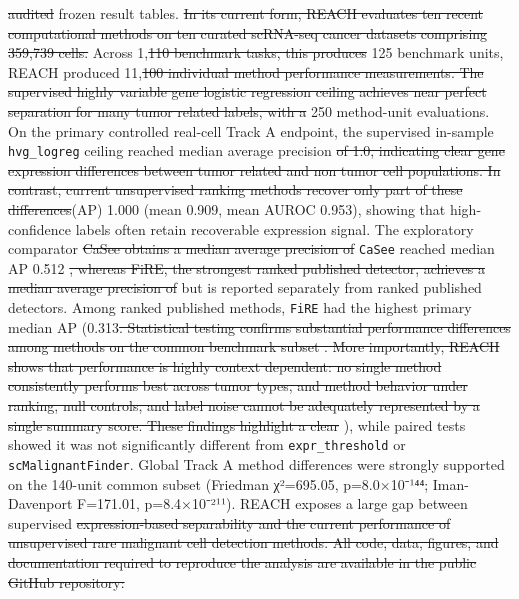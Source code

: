 \documentclass[10pt]{article}
\providecommand{\DIFaddtex}[1]{{\protect\color{trackgreen}#1}} %
\providecommand{\DIFdeltex}[1]{{\protect\color{red}\sout{#1}}}                      %
\providecommand{\DIFaddbegin}{} %
\providecommand{\DIFaddend}{} %
\providecommand{\DIFdelbegin}{} %
\providecommand{\DIFdelend}{} %
\providecommand{\DIFadd}[1]{\texorpdfstring{\DIFaddtex{#1}}{#1}} %
\providecommand{\DIFdel}[1]{\texorpdfstring{\DIFdeltex{#1}}{}} %
\newcommand{\DIFscaledelfig}{0.5}
\newlength{\DIFdelgraphicswidth} %
\newlength{\DIFdelgraphicsheight} %
\newcommand{\DIFaddincludegraphics}[2][]{{\color{trackgreen}\fbox{\DIFOincludegraphics[#1]{#2}}}} %
\newcommand{\DIFdelincludegraphics}[2][]{%
\sbox{\DIFdelgraphicsbox}{\DIFOincludegraphics[#1]{#2}}%
\settoboxwidth{\DIFdelgraphicswidth}{\DIFdelgraphicsbox} %
\settoboxtotalheight{\DIFdelgraphicsheight}{\DIFdelgraphicsbox} %
\scalebox{\DIFscaledelfig}{%
\parbox[b]{\DIFdelgraphicswidth}{\usebox{\DIFdelgraphicsbox}\\[-\baselineskip] \rule{\DIFdelgraphicswidth}{0em}}\llap{\resizebox{\DIFdelgraphicswidth}{\DIFdelgraphicsheight}{%
\setlength{\unitlength}{\DIFdelgraphicswidth}%
\begin{picture}(1,1)%
\thicklines\linethickness{2pt} %
{\color[rgb]{1,0,0}\put(0,0){\framebox(1,1){}}}%
{\color[rgb]{1,0,0}\put(0,0){\line( 1,1){1}}}%
{\color[rgb]{1,0,0}\put(0,1){\line(1,-1){1}}}%
\end{picture}%
}\hspace*{3pt}}} %
} %
\DeclareRobustCommand{\DIFaddbegin}{\DIFOaddbegin \let\includegraphics\DIFaddincludegraphics} %
\DeclareRobustCommand{\DIFaddend}{\DIFOaddend \let\includegraphics\DIFOincludegraphics} %
\DeclareRobustCommand{\DIFdelbegin}{\DIFOdelbegin \let\includegraphics\DIFdelincludegraphics} %
\DeclareRobustCommand{\DIFdelend}{\DIFOaddend \let\includegraphics\DIFOincludegraphics} %
\begin{document}
\DIFdelbegin \DIFdel{audited
}\DIFdelend \DIFaddbegin \DIFadd{frozen }\DIFaddend result tables. \DIFdelbegin \DIFdel{In its current form, REACH evaluates ten recent computational methods on ten curated scRNA-seq cancer datasets comprising 359,739 cells. }\DIFdelend Across 1,\DIFdelbegin \DIFdel{110 benchmark tasks, this produces }\DIFdelend \DIFaddbegin \DIFadd{125 benchmark units, REACH produced
}\DIFaddend 11,\DIFdelbegin \DIFdel{100 individual method performance measurements. The supervised highly variable gene logistic regression ceiling
achieves near perfect separation for many tumor related labels, with a }\DIFdelend \DIFaddbegin \DIFadd{250 method-unit evaluations. On the primary controlled real-cell
Track A endpoint, the supervised in-sample }\texttt{\DIFadd{hvg\_logreg}} \DIFadd{ceiling
reached }\DIFaddend median average precision \DIFdelbegin \DIFdel{of 1.0, indicating clear gene expression differences between tumor related and non tumor cell populations. In contrast, current unsupervised ranking methods recover only part of these differences}\DIFdelend \DIFaddbegin \DIFadd{(AP) 1.000 (mean 0.909, mean AUROC
0.953), showing that high-confidence labels often retain recoverable
expression signal}\DIFaddend . The exploratory comparator \DIFdelbegin \DIFdel{CaSee obtains a median average precision of }\DIFdelend \DIFaddbegin \texttt{\DIFadd{CaSee}} \DIFadd{reached
median AP }\DIFaddend 0.512 \DIFdelbegin \DIFdel{, whereas FiRE, the strongest ranked published
detector, achieves a median average precision of }\DIFdelend \DIFaddbegin \DIFadd{but is reported separately from ranked published
detectors. Among ranked published methods, }\texttt{\DIFadd{FiRE}} \DIFadd{had the highest
primary median AP (}\DIFaddend 0.313\DIFdelbegin \DIFdel{. Statistical testing confirms substantial performance differences among methods on the common benchmark subset . More importantly, REACH shows that performance is highly context dependent: no single method consistently performs best across tumor types, and method behavior under ranking,
null controls, and label noise cannot be adequately represented by a single summary score. These findings highlight a
clear }\DIFdelend \DIFaddbegin \DIFadd{), while paired tests showed it was not
significantly different from }\texttt{\DIFadd{expr\_threshold}} \DIFadd{or
}\texttt{\DIFadd{scMalignantFinder}}\DIFadd{. Global Track A method differences were
strongly supported on the 140-unit common subset (Friedman χ²=695.05,
p=8.0×10⁻¹⁴⁴; Iman-Davenport F=171.01, p=8.4×10⁻²¹¹). REACH exposes a
large }\DIFaddend gap between supervised \DIFdelbegin \DIFdel{expression-based separability and the current performance of unsupervised
rare malignant cell detection methods. All code, data, figures,
and documentation required to reproduce the analysis are available in the public GitHub repository: }%
\end{document}
